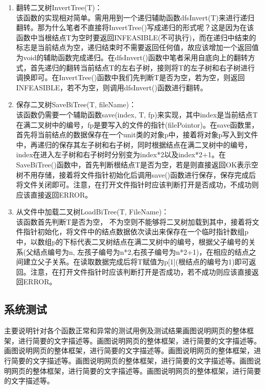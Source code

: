 \documentclass[supercite]{Experimental_Report}
\theoremstyle{definition}
\begin{document}
\begin{enumerate}
    \item 翻转二叉树InvertTree(T)：\\该函数的实现相对简单。需用用到一个递归辅助函数dfsInvert(T)来进行递归翻转。那为什么笔者不直接将InvertTree()写成递归的形式呢？这是因为在该函数中当根结点T为空时要返回INFEASIBLE(不可执行)，而在递归中结束的标志是当前结点为空，递归结束时不需要返回任何值，故应该增加一个返回值为void的辅助函数完成递归。在dfsInvert()函数中笔者采用自底向上的翻转方式，首先递归的翻转当前结点T的左右子树，接则将T的左子树和右子树进行调换即可。在InvertTree()函数中我们先判断T是否为空，若为空，则返回INFEASIBLE，若不为空，则调用dfsInvert()函数进行翻转。
    \item 保存二叉树SaveBiTree(T, fileName)：\\该函数仍需要一个辅助函数save(index, T, fp)来实现，其中index是当前结点T在满二叉树中的编号，fp是要写入的文件的指针(filePointor)。在save函数里，首先将当前结点的数据保存在一个unit类的对象p中，接着将对象p写入到文件中，再递归的保存其左子树和右子树，同时根据结点在满二叉树中的编号，index在进入左子树和右子树时分别变为index*2以及index*2+1。在SaveBiTree()函数中，首先判断根结点T是否为空，若是则直接返回OK表示空树不用存储，接着将文件指针初始化后调用save()函数进行保存，保存完成后将文件关闭即可。注意，在打开文件指针时应该判断打开是否成功，不成功则应该直接返回ERROR。
    \item 从文件中加载二叉树LoadBiTree(T, FileName)：\\该函数首先判断T是否为空， 不为空则不能够将二叉树加载到其中，接着将文件指针初始化，将文件中的结点数据依次读出来保存在一个临时指针数组p中，以数组p的下标代表二叉树结点在满二叉树中的编号，根据父子编号的关系(父结点编号为n, 左孩子编号为n*2,右孩子编号为n*2+1)，在相应的结点之间建立父子关系。在读取数据完成后将T赋值为p[1](根结点的编号为1)即可返回。注意，在打开文件指针时应该判断打开是否成功，若不成功则应该直接返回ERROR。
\end{enumerate}


\subsection{系统测试}

主要说明针对各个函数正常和异常的测试用例及测试结果画图说明网页的整体框架，进行简要的文字描述等。画图说明网页的整体框架，进行简要的文字描述等。画图说明网页的整体框架，进行简要的文字描述等。画图说明网页的整体框架，进行简要的文字描述等。画图说明网页的整体框架，进行简要的文字描述等。画图说明网页的整体框架，进行简要的文字描述等。画图说明网页的整体框架，进行简要的文字描述等。
\end{document}
